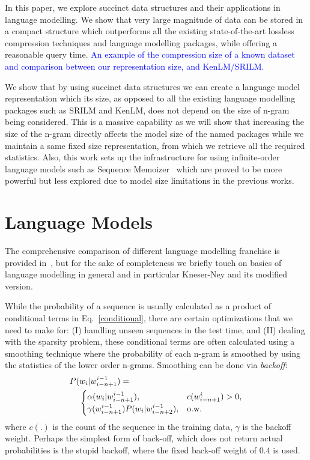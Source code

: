\documentclass[11pt]{article}
\newcommand{\TODO}[1]{\textcolor{blue}{#1}}
\begin{document}
In this paper, we explore succinct data structures and their applications in language modelling. We show that very large magnitude of data can be stored in a compact structure which outperforms all the existing state-of-the-art lossless compression techniques and language modelling packages, while offering a reasonable query time. \TODO{An example of the compression size of a known dataset and comparison between our representation size, and KenLM/SRILM.}   



We show that by using succinct data structures we can create a language model representation which its size, as opposed to all the existing language modelling packages such as SRILM and KenLM, does not depend on the size of n-gram being considered. This is a massive capability as we will show that increasing the size of the n-gram directly affects the model size of the named packages while we maintain a same fixed size representation, from which we retrieve all the required statistics. Also, this work sets up the infrastructure for using infinite-order language models such as Sequence Memoizer~\citep{wood2011sequence} which are proved to be more powerful but less explored due to model size limitations in the previous works.


\section{Language Models}
The comprehensive comparison of different language modelling franchise is provided in~\citep{chen1996empirical}, but for the sake of completeness we briefly touch on basics of language modelling in general and in particular Kneser-Ney and its modified version.

While the probability of a sequence is usually calculated as a product of conditional terms in Eq.~\ref{conditional}, there are certain optimizations that we need to make for: (I) handling unseen sequences in the test time, and (II) dealing with the sparsity problem, these conditional terms are often calculated using a smoothing technique where the probability of each n-gram is smoothed by using the statistics of the lower order n-grams. Smoothing can be done via \emph{backoff}:
\begin{align}
&P(w_{i}|w_{i-n+1}^{i-1}) = \\ 
&\hspace{4mm}\begin{cases}
  \alpha(w_{i}|w_{i-n+1}^{i-1}), &  c(w_{i-n+1}^{i})>0, \\\nonumber
  \gamma(w_{i-n+1}^{i-1})P(w_{i}|w_{i-n+2}^{i-1}), & \text{o.w.}
\end{cases}
\end{align} 
where $c(.)$ is the count of the sequence in the training data, $\gamma$ is the backoff weight. Perhaps the simplest form of back-off, which does not return actual probabilities is the stupid backoff, where the fixed back-off weight of $0.4$ is used. 
\end{document}
